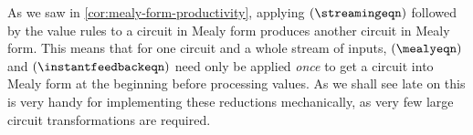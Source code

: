 \begin{remark}
    As we saw in \cref{cor:mealy-form-productivity}, applying
    \((\streamingeqn)\) followed by the value rules to a circuit in Mealy form
    produces another circuit in Mealy form.
    This means that for one circuit and a whole stream of inputs,
    \((\mealyeqn)\) and \((\instantfeedbackeqn)\) need only be applied
    \emph{once} to get a circuit into Mealy form at the beginning before
    processing values.
    As we shall see late on this is very handy for implementing these reductions
    mechanically, as very few large circuit transformations are required.
\end{remark}